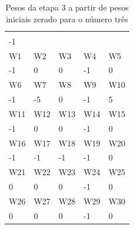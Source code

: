 \documentclass[11pt]{article}
\begin{document}
\begin{table}[h]
\centering
\caption{Pesos da etapa 3 a partir de pesos iniciais zerado para o número três}
\label{tab:wp3z_3}
\begin{tabular}{lllll}
\cellcolor[HTML]{000000}{\color[HTML]{FFFFFF} W0} &                            &                            &                            &                            \\
-1                                                &                            &                            &                            &                            \\
\rowcolor[HTML]{000000}
{\color[HTML]{FFFFFF} W1}                         & {\color[HTML]{FFFFFF} W2}  & {\color[HTML]{FFFFFF} W3}  & {\color[HTML]{FFFFFF} W4}  & {\color[HTML]{FFFFFF} W5}  \\
-1                                                & 0                          & 0                          & -1                         & 0                          \\
\rowcolor[HTML]{000000}
{\color[HTML]{FFFFFF} W6}                         & {\color[HTML]{FFFFFF} W7}  & {\color[HTML]{FFFFFF} W8}  & {\color[HTML]{FFFFFF} W9}  & {\color[HTML]{FFFFFF} W10} \\
-1                                                & -5                         & 0                          & -1                         & 5                          \\
\rowcolor[HTML]{000000}
{\color[HTML]{FFFFFF} W11}                        & {\color[HTML]{FFFFFF} W12} & {\color[HTML]{FFFFFF} W13} & {\color[HTML]{FFFFFF} W14} & {\color[HTML]{FFFFFF} W15} \\
-1                                                & 0                          & 0                          & -1                         & 0                          \\
\rowcolor[HTML]{000000}
{\color[HTML]{FFFFFF} W16}                        & {\color[HTML]{FFFFFF} W17} & {\color[HTML]{FFFFFF} W18} & {\color[HTML]{FFFFFF} W19} & {\color[HTML]{FFFFFF} W20} \\
-1                                                & -1                         & -1                         & -1                         & 0                          \\
\rowcolor[HTML]{000000}
{\color[HTML]{FFFFFF} W21}                        & {\color[HTML]{FFFFFF} W22} & {\color[HTML]{FFFFFF} W23} & {\color[HTML]{FFFFFF} W24} & {\color[HTML]{FFFFFF} W25} \\
0                                                 & 0                          & 0                          & -1                         & 0                          \\
\rowcolor[HTML]{000000}
{\color[HTML]{FFFFFF} W26}                        & {\color[HTML]{FFFFFF} W27} & {\color[HTML]{FFFFFF} W28} & {\color[HTML]{FFFFFF} W29} & {\color[HTML]{FFFFFF} W30} \\
0                                                 & 0                          & 0                          & -1                         & 0
\end{tabular}
\end{table}
\end{document}
